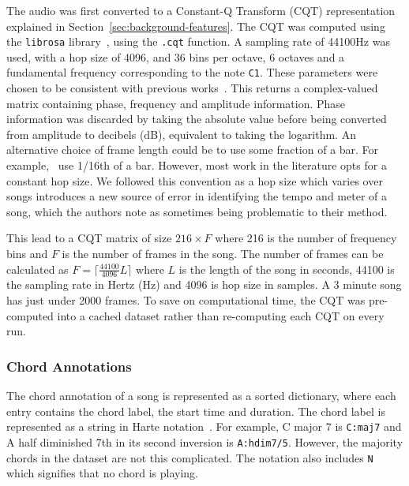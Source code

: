The audio was first converted to a Constant-Q Transform (CQT) representation explained in Section~\ref{sec:background-features}. The CQT was computed using the \texttt{librosa} library~\citep{librosa}, using the \texttt{.cqt} function. A sampling rate of 44100Hz was used, with a hop size of 4096, and 36 bins per octave, 6 octaves and a fundamental frequency corresponding to the note \texttt{C1}. These parameters were chosen to be consistent with previous works~\citep{StructuredTraining}. This returns a complex-valued matrix containing phase, frequency and amplitude information. Phase information was discarded by taking the absolute value before being converted from amplitude to decibels (dB), equivalent to taking the logarithm. An alternative choice of frame length could be to use some fraction of a bar. For example,~\citet{MelodyTranscriptionViaGenerativePreTraining} use 1/16th of a bar. However, most work in the literature opts for a constant hop size. We followed this convention as a hop size which varies over songs introduces a new source of error in identifying the tempo and meter of a song, which the authors note as sometimes being problematic to their method.

This lead to a CQT matrix of size $216 \times F$ where 216 is the number of frequency bins and $F$ is the number of frames in the song. The number of frames can be calculated as $F = \lceil \frac{44100}{4096} L  \rceil$ where $L$ is the length of the song in seconds, 44100 is the sampling rate in Hertz (Hz) and 4096 is hop size in samples. A 3 minute song has just under 2000 frames. To save on computational time, the CQT was pre-computed into a cached dataset rather than re-computing each CQT on every run.

\subsubsection{Chord Annotations}\label{sec:chord-annotations}

The chord annotation of a song is represented as a sorted dictionary, where each entry contains the chord label, the start time and duration. The chord label is represented as a string in Harte notation~\citep{HarteNotation}. For example, C major 7 is \texttt{C:maj7} and A half diminished 7th in its second inversion is \texttt{A:hdim7/5}. However, the majority chords in the dataset are not this complicated. The notation also includes \texttt{N} which signifies that no chord is playing. 

